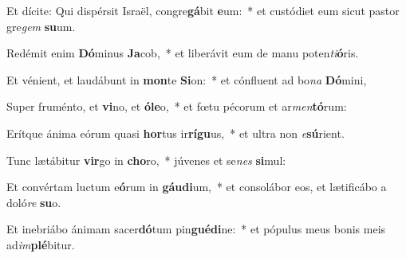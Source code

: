 \item Et dícite: Qui dispérsit Israël, congre\textbf{gá}bit \textbf{e}um:~* et custódiet eum sicut pastor gre\textit{gem} \textbf{su}um.
\item Redémit enim \textbf{Dó}minus \textbf{Ja}cob,~* et liberávit eum de manu poten\textit{ti}\textbf{ó}ris.
\item Et vénient, et laudábunt in \textbf{mon}te \textbf{Si}on:~* et cónfluent ad bo\textit{na} \textbf{Dó}mini,
\item Super fruménto, et \textbf{vi}no, et \textbf{ó}\textbf{le}o,~* et fœtu pécorum et ar\textit{men}\textbf{tó}rum:
\item Erítque ánima eórum quasi \textbf{hor}tus ir\textbf{rí}\textbf{gu}us,~* et ultra non \textit{e}\textbf{sú}rient.
\item Tunc lætábitur \textbf{vir}go in \textbf{cho}ro,~* júvenes et se\textit{nes} \textbf{si}mul:
\item Et convértam luctum e\textbf{ó}rum in \textbf{gáu}\textbf{di}um,~* et consolábor eos, et lætificábo a doló\textit{re} \textbf{su}o.
\item Et inebriábo ánimam sacer\textbf{dó}tum pin\textbf{gué}\textbf{di}ne:~* et pópulus meus bonis meis ad\textit{im}\textbf{plé}bitur.
